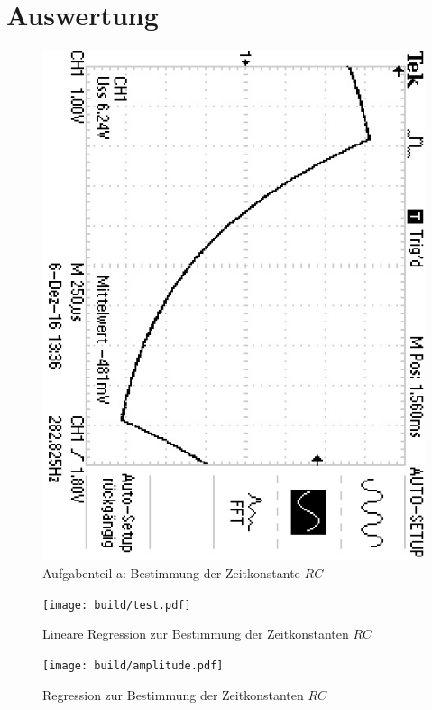 \section{Auswertung}
\label{sec:Auswertung}

\begin{figure}
	\centering
	\includegraphics[angle=90]{bilder/F0000TEK.JPG}
	\caption{Aufgabenteil a: Bestimmung der Zeitkonstante $RC$}
	\label{fig:plotrc}
\end{figure}

\begin{figure}
  \centering
  \texttt{[image: build/test.pdf]}
  \caption{Lineare Regression zur Bestimmung der Zeitkonstanten $RC$}
  \label{fig:plota}
\end{figure}

\begin{figure}
  \centering
  \texttt{[image: build/amplitude.pdf]}
  \caption{Regression zur Bestimmung der Zeitkonstanten $RC$}
  \label{fig:plota}
\end{figure}

